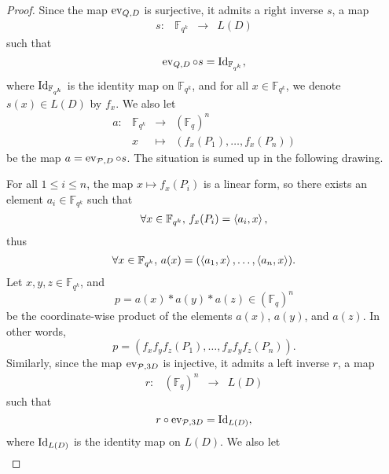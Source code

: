 \documentclass[a4paper,11pt]{article}
\begin{document}
\begin{proof}
  Since the map $\operatorname{ev}_{Q, D}$ is surjective, it admits a right inverse $s$, \ie a
  map
  \[
        \begin{array}{cccc}
          s: & \mathbb{F}_{q^k} & \to & L(D)
\end{array}
  \]
  such that
  \[
    \operatorname{ev}_{Q, D}\circ s = \operatorname{Id}_{\mathbb{F}_{q^k}},
  \]
  where $\operatorname{Id}_{\mathbb{F}_{q^k}}$ is the identity map on $\mathbb{F}_{q^k}$, and
  for all $x\in\mathbb{F}_{q^k}$, we denote $s(x)\in L(D)$ by $f_x$. We
  also let
  \[
        \begin{array}{cccc}
          a: & \mathbb{F}_{q^k} & \to & (\mathbb{F}_{q})^n \\
          & x & \mapsto & (f_x(P_1), \dots, f_x(P_n))
\end{array}
  \]
  be the map $a = \operatorname{ev}_{\mathcal{P}, D}\circ s$. The situation is sumed up in the
  following drawing.
   \begin{center}
  \end{center}
  For all $1\leq i\leq n$, the map
  $x\mapsto f_x(P_i)$ is a linear form, so there exists an element
  $a_i\in\mathbb{F}_{q^k}$ such that
  \[
    \forall x\in\mathbb{F}_{q^k},\, f_x(P_i) = \left\langle a_i,x\right\rangle,
  \]
  thus
  \[
    \forall x\in\mathbb{F}_{q^k},\, a(x) = (\left\langle a_1,x\right\rangle, \dots, \left\langle a_n,x\right\rangle).
  \]
  Let $x, y, z\in\mathbb{F}_{q^k}$, and
  \[
    p = a(x)*a(y)*a(z)\in(\mathbb{F}_{q})^n
  \]
  be the coordinate-wise product of the elements $a(x)$, $a(y)$, and $a(z)$. In
  other words,
  \[
    p = (f_xf_yf_z(P_1), \dots, f_xf_yf_z(P_n)).
  \]
  Similarly, since the map $\operatorname{ev}_{\mathcal{P}, 3D}$ is injective, it admits a left inverse $r$, \ie a
  map
  \[
        \begin{array}{cccc}
          r: & (\mathbb{F}_{q})^n & \to & L(D)
\end{array}
  \]
  such that
  \[
    r\circ\operatorname{ev}_{\mathcal{P}, 3D} = \operatorname{Id}_{L(D)},
  \]
  where $\operatorname{Id}_{L(D)}$ is the identity map on $L(D)$. We
  also let
  \[
        \begin{array}{cccc}

\end{array}\]
\end{proof}
\end{document}
